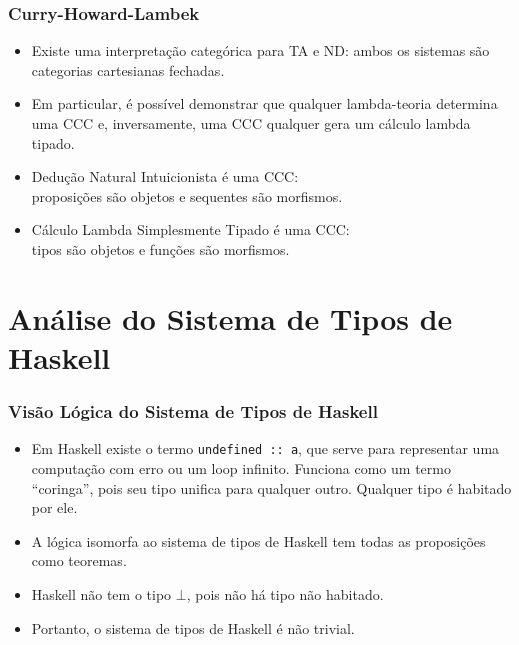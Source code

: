 \documentclass{beamer}
\begin{document}
  \begin{frame}
    \frametitle{Curry-Howard-Lambek}
    \begin{itemize}
      \item Existe uma interpreta\c{c}\~ao categ\'orica para TA e ND: ambos os sistemas
        s\~ao categorias cartesianas fechadas.
        \pause
      \item Em particular, \'e poss\'ivel demonstrar que qualquer lambda-teoria determina uma CCC e, inversamente,
        uma CCC qualquer gera um c\'alculo lambda tipado.
        \pause
      \item Dedu\c{c}\~ao Natural Intuicionista \'e uma CCC:\\
        proposi\c{c}\~oes s\~ao objetos e sequentes s\~ao morfismos.
        \pause
      \item C\'alculo Lambda Simplesmente Tipado \'e uma CCC:\\
        tipos s\~ao objetos e fun\c{c}\~oes s\~ao morfismos.
    \end{itemize}
  \end{frame}


  \section{An\'alise do Sistema de Tipos de Haskell}
  \begin{frame}[fragile]
    \frametitle{Vis\~ao L\'ogica do Sistema de Tipos de Haskell}
    \begin{itemize}
      \item Em Haskell existe o termo \texttt{undefined :: a}, que serve
        para representar uma computa\c{c}\~ao com erro ou um loop infinito. Funciona como um termo
        ``coringa'', pois seu tipo unifica para qualquer outro. Qualquer tipo \'e habitado por ele.
        \pause
      \item A l\'ogica isomorfa ao sistema de tipos de Haskell tem todas as proposi\c{c}\~oes como teoremas.
        \pause
      \item Haskell n\~ao tem o tipo $\bot$, pois n\~ao h\'a tipo n\~ao habitado.
        \pause
      \item Portanto, o sistema de tipos de Haskell \'e n\~ao trivial.

    \end{itemize}
\end{frame}
\end{document}
